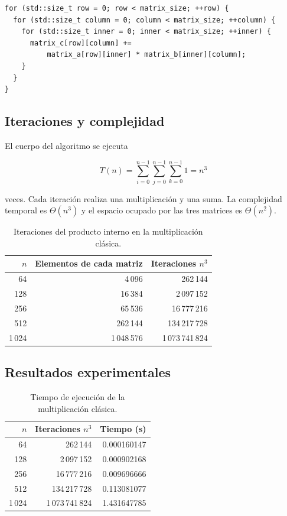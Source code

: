 \documentclass[a4paper,12pt]{article}
\begin{document}
\begin{lstlisting}[caption={Tres bucles de la multiplicación clásica}]
for (std::size_t row = 0; row < matrix_size; ++row) {
  for (std::size_t column = 0; column < matrix_size; ++column) {
    for (std::size_t inner = 0; inner < matrix_size; ++inner) {
      matrix_c[row][column] +=
          matrix_a[row][inner] * matrix_b[inner][column];
    }
  }
}
\end{lstlisting}

\subsection{Iteraciones y complejidad}

El cuerpo del algoritmo se ejecuta

\[
T(n)=\sum_{i=0}^{n-1}\sum_{j=0}^{n-1}\sum_{k=0}^{n-1}1=n^3
\]

veces. Cada iteración realiza una multiplicación y una suma. La complejidad
temporal es \(\Theta(n^3)\) y el espacio ocupado por las tres matrices es
\(\Theta(n^2)\).

\begin{table}[H]
    \centering
    \caption{Iteraciones del producto interno en la multiplicación clásica.}
    \label{tab:classic-iterations}
    \begin{tabular}{r r r}
        \toprule
        \(n\) & Elementos de cada matriz & Iteraciones \(n^3\) \\
        \midrule
        64  & 4\,096  & 262\,144 \\
        128 & 16\,384 & 2\,097\,152 \\
        256 & 65\,536 & 16\,777\,216 \\
        512 & 262\,144 & 134\,217\,728 \\
        1\,024 & 1\,048\,576  & 1\,073\,741\,824 \\
        \bottomrule
    \end{tabular}
\end{table}

\subsection{Resultados experimentales}

\begin{table}[H]
    \centering
    \caption{Tiempo de ejecución de la multiplicación clásica.}
    \label{tab:classic-times}
    \begin{tabular}{r r r}
        \toprule
        \(n\) & Iteraciones \(n^3\) & Tiempo (s) \\
        \midrule
        64  & 262\,144       & 0.000160147 \\
        128 & 2\,097\,152    & 0.000902168 \\
        256 & 16\,777\,216  & 0.009696666 \\
        512 & 134\,217\,728 & 0.113081077 \\
        1\,024 & 1\,073\,741\,824 & 1.431647785 \\
        \bottomrule
    \end{tabular}
\end{table}
\end{document}
